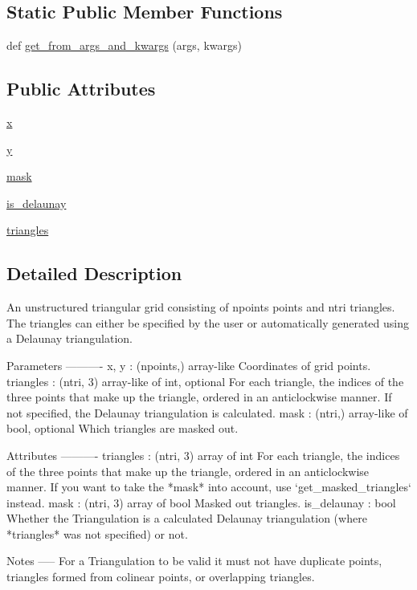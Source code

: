 \subsection*{Static Public Member Functions}
\begin{DoxyCompactItemize}
\item 
def \hyperlink{classmatplotlib_1_1tri_1_1triangulation_1_1Triangulation_a74e48fb0dcec489c4f98d3715fd5cb00}{get\+\_\+from\+\_\+args\+\_\+and\+\_\+kwargs} (args, kwargs)
\end{DoxyCompactItemize}
\subsection*{Public Attributes}
\begin{DoxyCompactItemize}
\item 
\hyperlink{classmatplotlib_1_1tri_1_1triangulation_1_1Triangulation_aa361148318a0bd7779e1430621b5fe44}{x}
\item 
\hyperlink{classmatplotlib_1_1tri_1_1triangulation_1_1Triangulation_aff84cb603026d3c8301491543810b8e5}{y}
\item 
\hyperlink{classmatplotlib_1_1tri_1_1triangulation_1_1Triangulation_a742c896bb64598790b0bf91b329c2a93}{mask}
\item 
\hyperlink{classmatplotlib_1_1tri_1_1triangulation_1_1Triangulation_ae9ef3ea60fcc8f0ddad0fbb33440d824}{is\+\_\+delaunay}
\item 
\hyperlink{classmatplotlib_1_1tri_1_1triangulation_1_1Triangulation_ab9d9665d45a762203258ebbc00695f95}{triangles}
\end{DoxyCompactItemize}


\subsection{Detailed Description}
\begin{DoxyVerb}An unstructured triangular grid consisting of npoints points and
ntri triangles.  The triangles can either be specified by the user
or automatically generated using a Delaunay triangulation.

Parameters
----------
x, y : (npoints,) array-like
    Coordinates of grid points.
triangles : (ntri, 3) array-like of int, optional
    For each triangle, the indices of the three points that make
    up the triangle, ordered in an anticlockwise manner.  If not
    specified, the Delaunay triangulation is calculated.
mask : (ntri,) array-like of bool, optional
    Which triangles are masked out.

Attributes
----------
triangles : (ntri, 3) array of int
    For each triangle, the indices of the three points that make
    up the triangle, ordered in an anticlockwise manner. If you want to
    take the *mask* into account, use `get_masked_triangles` instead.
mask : (ntri, 3) array of bool
    Masked out triangles.
is_delaunay : bool
    Whether the Triangulation is a calculated Delaunay
    triangulation (where *triangles* was not specified) or not.

Notes
-----
For a Triangulation to be valid it must not have duplicate points,
triangles formed from colinear points, or overlapping triangles.
\end{DoxyVerb}
 

